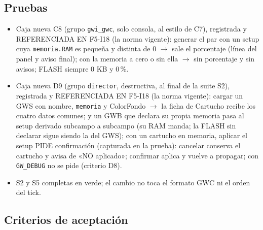 \subsection{Pruebas}
\label{sec:F5I20Pruebas}

\begin{itemize}
	\item Caja nueva C8 (grupo \texttt{gwi\_gwc}, solo consola, al estilo de
	C7), registrada y REFERENCIADA EN F5-I18 (la norma vigente): generar el
	par con un setup cuya \texttt{memoria.RAM} es pequeña y distinta de 0
	$\to$ sale el porcentaje (línea del panel y aviso final); con la
	memoria a cero o sin ella $\to$ sin porcentaje y sin avisos; FLASH
	siempre 0 KB y 0\,\%.
	\item Caja nueva D9 (grupo \texttt{director}, destructiva, al final de
	la suite S2), registrada y REFERENCIADA EN F5-I18 (la norma vigente):
	cargar un GWS con nombre, \texttt{memoria} y ColorFondo $\to$ la ficha
	de Cartucho recibe los cuatro datos comunes; y un GWB que declara su
	propia memoria pasa al setup derivado subcampo a subcampo (su RAM
	manda; la FLASH sin declarar sigue siendo la del GWS); con un
	cartucho en memoria, aplicar el setup PIDE confirmación (capturada en
	la prueba): cancelar conserva el cartucho y avisa de «NO aplicado»;
	confirmar aplica y vuelve a propagar; con \texttt{GW\_DEBUG} no se
	pide (criterio D8).
	\item S2 y S5 completas en verde; el cambio no toca el formato GWC ni el
	orden del tick.
\end{itemize}

\subsection{Criterios de aceptación}
\label{sec:F5I20Criterios}

